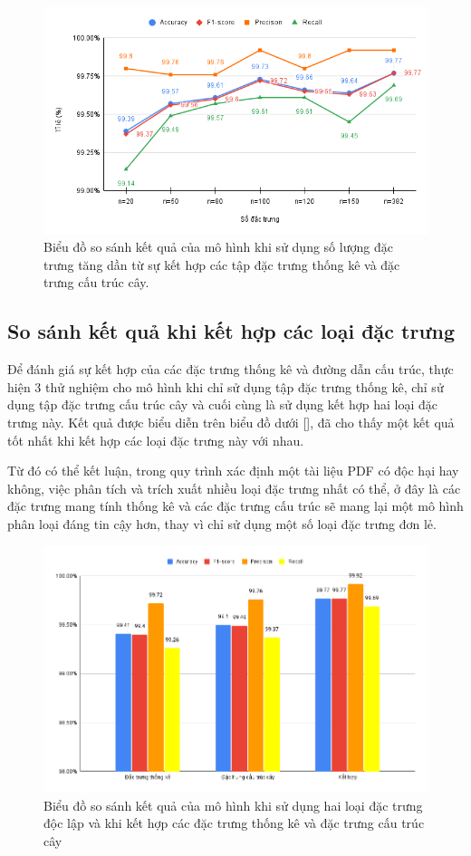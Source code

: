 \documentclass[./../main.tex]{subfiles}
\begin{document}
\begin{figure}[H]
	\centering
	\includegraphics[width=\linewidth]{./images/exp1_top_all_feat.png}
	\caption{Biểu đồ so sánh kết quả của mô hình khi sử dụng số lượng đặc trưng tăng dần từ sự kết hợp các tập đặc trưng thống kê và đặc trưng cấu trúc cây.}
	\label{fig:exp1_top_all_feat}
\end{figure}

\subsection{So sánh kết quả khi kết hợp các loại đặc trưng}
Để đánh giá sự kết hợp của các đặc trưng thống kê và đường dẫn cấu trúc, thực hiện 3 thử nghiệm cho mô hình khi chỉ sử dụng tập đặc trưng thống kê, chỉ sử dụng tập đặc trưng cấu trúc cây và cuối cùng là sử dụng kết hợp hai loại đặc trưng này. Kết quả được biểu diễn trên biểu đồ dưới [], đã cho thấy một kết quả tốt nhất khi kết hợp các loại đặc trưng này với nhau.

Từ đó có thể kết luận, trong quy trình xác định một tài liệu PDF có độc hại hay không, việc phân tích và trích xuất nhiều loại đặc trưng nhất có thể, ở đây là các đặc trưng mang tính thống kê và các đặc trưng cấu trúc sẽ mang lại một mô hình phân loại đáng tin cậy hơn, thay vì chỉ sử dụng một số loại đặc trưng đơn lẻ.

\begin{figure}[H]
	\centering
	\includegraphics[width=\linewidth]{./images/exp1_compare_combination.png}
	\caption{Biểu đồ so sánh kết quả của mô hình khi sử dụng hai loại đặc trưng độc lập và khi kết hợp các đặc trưng thống kê và đặc trưng cấu trúc cây}
	\label{fig:exp1_compare_combination}
\end{figure}
\end{document}
